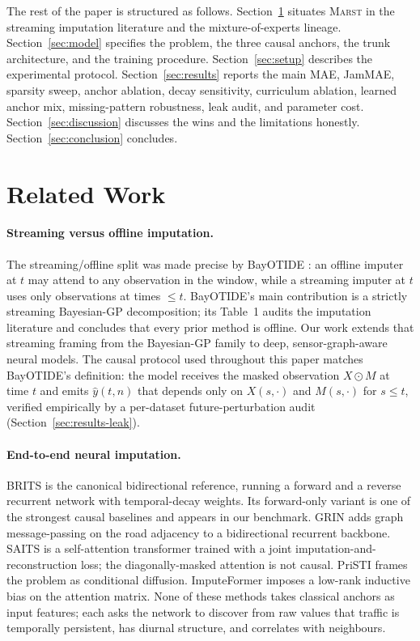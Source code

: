 \documentclass[11pt]{article}
\newcommand{\MARST}{\textsc{Marst}\xspace}
\begin{document}
The rest of the paper is structured as follows.  Section~\ref{sec:related}
situates \MARST in the streaming imputation literature and the
mixture-of-experts lineage.  Section~\ref{sec:model} specifies the
problem, the three causal anchors, the trunk architecture, and the
training procedure.  Section~\ref{sec:setup} describes the experimental
protocol.  Section~\ref{sec:results} reports the main MAE, JamMAE,
sparsity sweep, anchor ablation, decay sensitivity, curriculum
ablation, learned anchor mix, missing-pattern robustness, leak audit,
and parameter cost.  Section~\ref{sec:discussion} discusses the wins
and the limitations honestly.  Section~\ref{sec:conclusion} concludes.

\section{Related Work}
\label{sec:related}

\paragraph{Streaming versus offline imputation.}
The streaming/offline split was made precise by BayOTIDE
\citep{fang2024bayotide}: an offline imputer at $t$ may attend to any
observation in the window, while a streaming imputer at $t$ uses only
observations at times $\leq t$.  BayOTIDE's main contribution is a
strictly streaming Bayesian-GP decomposition; its Table~1 audits the
imputation literature and concludes that every prior method is offline.
Our work extends that streaming framing from the Bayesian-GP family to
deep, sensor-graph-aware neural models.  The causal protocol used
throughout this paper matches BayOTIDE's definition: the model receives
the masked observation $X \odot M$ at time $t$ and emits $\hat{y}(t,n)$
that depends only on $X(s, \cdot)$ and $M(s, \cdot)$ for $s \leq t$,
verified empirically by a per-dataset future-perturbation audit
(Section~\ref{sec:results-leak}).

\paragraph{End-to-end neural imputation.}
BRITS \citep{cao2018brits} is the canonical bidirectional reference,
running a forward and a reverse recurrent network with temporal-decay
weights.  Its forward-only variant is one of the strongest causal
baselines and appears in our benchmark.  GRIN \citep{cini2022grin}
adds graph message-passing on the road adjacency to a bidirectional
recurrent backbone.  SAITS \citep{du2023saits} is a self-attention
transformer trained with a joint imputation-and-reconstruction loss;
the diagonally-masked attention is not causal.  PriSTI
\citep{liu2023pristi} frames the problem as conditional diffusion.
ImputeFormer \citep{nie2024imputeformer} imposes a low-rank inductive
bias on the attention matrix.  None of these methods takes classical
anchors as input features; each asks the network to discover from raw
values that traffic is temporally persistent, has diurnal structure,
and correlates with neighbours.
\end{document}
